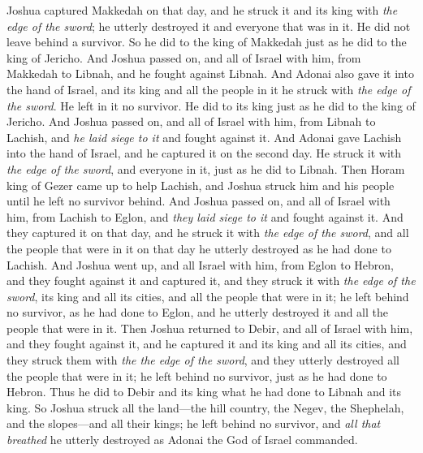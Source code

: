 \begin{biblechapter}
\verse Joshua captured Makkedah on that day, and he struck it and its king with \textit{the edge of the sword}; he utterly destroyed it and everyone that was in it. He did not leave behind a survivor. So he did to the king of Makkedah just as he did to the king of Jericho.
 And Joshua passed on, and all of Israel with him, from Makkedah to Libnah, and he fought against Libnah.
\verse And Adonai also gave it into the hand of Israel, and its king and all the people in it he struck with \textit{the edge of the sword}. He left in it no survivor. He did to its king just as he did to the king of Jericho.
\verse And Joshua passed on, and all of Israel with him, from Libnah to Lachish, and \textit{he laid siege to it} and fought against it.
\verse And Adonai gave Lachish into the hand of Israel, and he captured it on the second day. He struck it with \textit{the edge of the sword}, and everyone in it, just as he did to Libnah.
\verse Then Horam king of Gezer came up to help Lachish, and Joshua struck him and his people until he left no survivor behind.
\verse And Joshua passed on, and all of Israel with him, from Lachish to Eglon, and \textit{they laid siege to it} and fought against it.
\verse And they captured it on that day, and he struck it with \textit{the edge of the sword}, and all the people that were in it on that day he utterly destroyed as he had done to Lachish.
\verse And Joshua went up, and all Israel with him, from Eglon to Hebron, and they fought against it
\verse and captured it, and they struck it with \textit{the edge of the sword}, its king and all its cities, and all the people that were in it; he left behind no survivor, as he had done to Eglon, and he utterly destroyed it and all the people that were in it.
\verse Then Joshua returned to Debir, and all of Israel with him, and they fought against it,
\verse and he captured it and its king and all its cities, and they struck them with \textit{the the edge of the sword}, and they utterly destroyed all the people that were in it; he left behind no survivor, just as he had done to Hebron. Thus he did to Debir and its king what he had done to Libnah and its king.
\verse So Joshua struck all the land—the hill country, the Negev, the Shephelah, and the slopes—and all their kings; he left behind no survivor, and \textit{all that breathed} he utterly destroyed as Adonai the God of Israel commanded.

\end{biblechapter}
